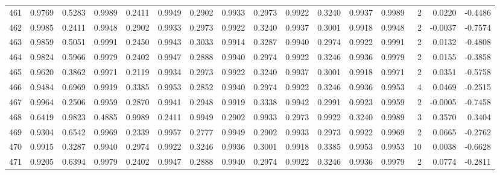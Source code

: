 \begin{tabular}{lrrrrrrrrrrrrrrr}
461 &      0.9769 &  0.5283 &  0.9989 &  0.2411 &  0.9949 &  0.2902 &  0.9933 &  0.2973 &  0.9922 &  0.3240 &   0.9937 &     0.9989 &      2 &                    0.0220 &                    -0.4486 \\
462 &      0.9985 &  0.2411 &  0.9948 &  0.2902 &  0.9933 &  0.2973 &  0.9922 &  0.3240 &  0.9937 &  0.3001 &   0.9918 &     0.9948 &      2 &                   -0.0037 &                    -0.7574 \\
463 &      0.9859 &  0.5051 &  0.9991 &  0.2450 &  0.9943 &  0.3033 &  0.9914 &  0.3287 &  0.9940 &  0.2974 &   0.9922 &     0.9991 &      2 &                    0.0132 &                    -0.4808 \\
464 &      0.9824 &  0.5966 &  0.9979 &  0.2402 &  0.9947 &  0.2888 &  0.9940 &  0.2974 &  0.9922 &  0.3246 &   0.9936 &     0.9979 &      2 &                    0.0155 &                    -0.3858 \\
465 &      0.9620 &  0.3862 &  0.9971 &  0.2119 &  0.9934 &  0.2973 &  0.9922 &  0.3240 &  0.9937 &  0.3001 &   0.9918 &     0.9971 &      2 &                    0.0351 &                    -0.5758 \\
466 &      0.9484 &  0.6969 &  0.9919 &  0.3385 &  0.9953 &  0.2852 &  0.9940 &  0.2974 &  0.9922 &  0.3246 &   0.9936 &     0.9953 &      4 &                    0.0469 &                    -0.2515 \\
467 &      0.9964 &  0.2506 &  0.9959 &  0.2870 &  0.9941 &  0.2948 &  0.9919 &  0.3338 &  0.9942 &  0.2991 &   0.9923 &     0.9959 &      2 &                   -0.0005 &                    -0.7458 \\
468 &      0.6419 &  0.9823 &  0.4885 &  0.9989 &  0.2411 &  0.9949 &  0.2902 &  0.9933 &  0.2973 &  0.9922 &   0.3240 &     0.9989 &      3 &                    0.3570 &                     0.3404 \\
469 &      0.9304 &  0.6542 &  0.9969 &  0.2339 &  0.9957 &  0.2777 &  0.9949 &  0.2902 &  0.9933 &  0.2973 &   0.9922 &     0.9969 &      2 &                    0.0665 &                    -0.2762 \\
470 &      0.9915 &  0.3287 &  0.9940 &  0.2974 &  0.9922 &  0.3246 &  0.9936 &  0.3001 &  0.9918 &  0.3385 &   0.9953 &     0.9953 &     10 &                    0.0038 &                    -0.6628 \\
471 &      0.9205 &  0.6394 &  0.9979 &  0.2402 &  0.9947 &  0.2888 &  0.9940 &  0.2974 &  0.9922 &  0.3246 &   0.9936 &     0.9979 &      2 &                    0.0774 &                    -0.2811 \\

\end{tabular}

